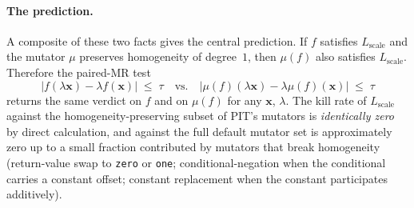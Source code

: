 \documentclass[acmsmall,screen,review]{acmart}
\begin{document}
\paragraph{The prediction.}
A composite of these two facts gives the central prediction. If $f$
satisfies $L_{\mathrm{scale}}$ and the mutator $\mu$ preserves
homogeneity of degree~$1$, then $\mu(f)$ also satisfies
$L_{\mathrm{scale}}$. Therefore the paired-MR test
\begin{equation*}
\big| f(\lambda \mathbf{x}) - \lambda f(\mathbf{x}) \big| \;\le\; \tau
\quad \mathrm{vs.} \quad
\big| \mu(f)(\lambda \mathbf{x}) - \lambda \mu(f)(\mathbf{x}) \big| \;\le\; \tau
\end{equation*}
returns the same verdict on $f$ and on $\mu(f)$ for any
$\mathbf{x}$, $\lambda$. The kill rate of $L_{\mathrm{scale}}$ against
the homogeneity-preserving subset of PIT's mutators is
\emph{identically zero} by direct calculation, and against the full
default mutator set is approximately zero up to a small fraction
contributed by mutators that break homogeneity (return-value swap to
\texttt{zero} or \texttt{one}; conditional-negation when the
conditional carries a constant offset; constant replacement when the
constant participates additively).
\end{document}
